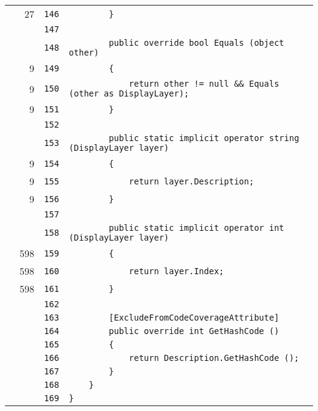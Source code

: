 \documentclass[a4paper,10pt]{article}
\begin{document}
\begin{longtable}[l]{lrrl}
\cellcolor{green} & 27 & \verb~146~ & \verb~        }~\\
\cellcolor{gray} &  & \verb~147~ & \verb~~\\
\cellcolor{gray} &  & \verb~148~ & \verb~        public override bool Equals (object other)~\\
\cellcolor{green} & 9 & \verb~149~ & \verb~        {~\\
\cellcolor{green} & 9 & \verb~150~ & \verb~            return other != null && Equals (other as DisplayLayer);~\\
\cellcolor{green} & 9 & \verb~151~ & \verb~        }~\\
\cellcolor{gray} &  & \verb~152~ & \verb~~\\
\cellcolor{gray} &  & \verb~153~ & \verb~        public static implicit operator string (DisplayLayer layer)~\\
\cellcolor{green} & 9 & \verb~154~ & \verb~        {~\\
\cellcolor{green} & 9 & \verb~155~ & \verb~            return layer.Description;~\\
\cellcolor{green} & 9 & \verb~156~ & \verb~        }~\\
\cellcolor{gray} &  & \verb~157~ & \verb~~\\
\cellcolor{gray} &  & \verb~158~ & \verb~        public static implicit operator int (DisplayLayer layer)~\\
\cellcolor{green} & 598 & \verb~159~ & \verb~        {~\\
\cellcolor{green} & 598 & \verb~160~ & \verb~            return layer.Index;~\\
\cellcolor{green} & 598 & \verb~161~ & \verb~        }~\\
\cellcolor{gray} &  & \verb~162~ & \verb~~\\
\cellcolor{gray} &  & \verb~163~ & \verb~        [ExcludeFromCodeCoverageAttribute]~\\
\cellcolor{gray} &  & \verb~164~ & \verb~        public override int GetHashCode ()~\\
\cellcolor{gray} &  & \verb~165~ & \verb~        {~\\
\cellcolor{gray} &  & \verb~166~ & \verb~            return Description.GetHashCode ();~\\
\cellcolor{gray} &  & \verb~167~ & \verb~        }~\\
\cellcolor{gray} &  & \verb~168~ & \verb~    }~\\
\cellcolor{gray} &  & \verb~169~ & \verb~}~\\
\end{longtable}
\newpage
\end{document}
